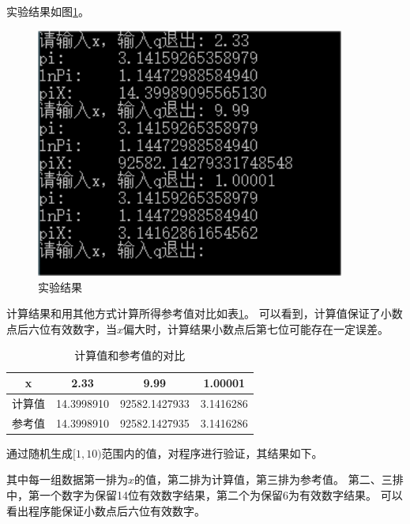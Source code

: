 \documentclass[11pt,a4paper]{ctexart}
\begin{document}
实验结果如图\ref{fig:result}。

\begin{figure}[H]
    \begin{center}
        \includegraphics[width=4in]{pic/result.png}
    \end{center}
    \caption{实验结果}
    \label{fig:result}
\end{figure}

计算结果和用其他方式计算所得参考值对比如表\ref{tab:contract}。
可以看到，计算值保证了小数点后六位有效数字，当$x$偏大时，计算结果小数点后第七位可能存在一定误差。

\begin{table}[H]
    \centering
    \begin{tabular}{|c|c|c|c|}
        \hline
        x & 2.33 & 9.99 & 1.00001 \\ \hline
        计算值 & 14.3998910 & 92582.1427933 & 3.1416286 \\ \hline
        参考值 & 14.3998910 & 92582.1427935 & 3.1416286 \\ \hline
    \end{tabular}
    \caption{计算值和参考值的对比}
    \label{tab:contract}
\end{table}

通过随机生成$[1, 10)$范围内的值，对程序进行验证，其结果如下。

其中每一组数据第一排为$x$的值，第二排为计算值，第三排为参考值。
第二、三排中，第一个数字为保留14位有效数字结果，第二个为保留6为有效数字结果。
可以看出程序能保证小数点后六位有效数字。


\end{document}
